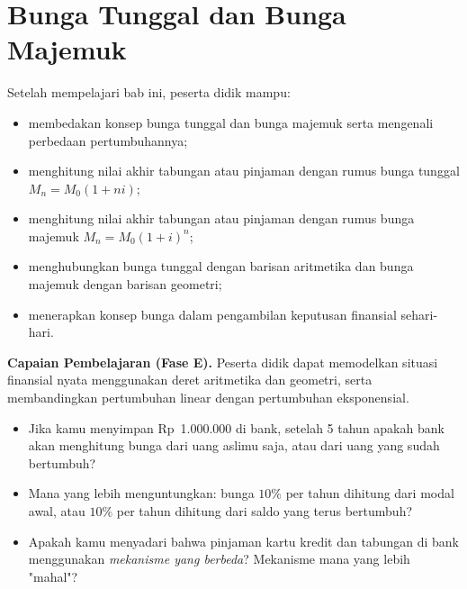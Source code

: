 \documentclass[11pt,a4paper]{report}
\theoremstyle{gaya}
\begin{document}
\chapter{Bunga Tunggal dan Bunga Majemuk}
\begin{tujuan}
Setelah mempelajari bab ini, peserta didik mampu:
\begin{itemize}[leftmargin=*,topsep=2pt]
  \item membedakan konsep bunga tunggal dan bunga majemuk serta mengenali perbedaan pertumbuhannya;
  \item menghitung nilai akhir tabungan atau pinjaman dengan rumus bunga tunggal $M_n = M_0(1+ni)$;
  \item menghitung nilai akhir tabungan atau pinjaman dengan rumus bunga majemuk $M_n = M_0(1+i)^n$;
  \item menghubungkan bunga tunggal dengan barisan aritmetika dan bunga majemuk dengan barisan geometri;
  \item menerapkan konsep bunga dalam pengambilan keputusan finansial sehari-hari.
\end{itemize}
\textbf{Capaian Pembelajaran (Fase E).} Peserta didik dapat memodelkan situasi finansial nyata menggunakan deret aritmetika dan geometri, serta membandingkan pertumbuhan linear dengan pertumbuhan eksponensial.
\end{tujuan}

\begin{pemantik}
\begin{itemize}[leftmargin=*,topsep=2pt]
  \item Jika kamu menyimpan Rp~1.000.000 di bank, setelah 5 tahun apakah bank akan menghitung bunga dari uang aslimu saja, atau dari uang yang sudah bertumbuh?
  \item Mana yang lebih menguntungkan: bunga $10\%$ per tahun dihitung dari modal awal, atau $10\%$ per tahun dihitung dari saldo yang terus bertumbuh?
  \item Apakah kamu menyadari bahwa pinjaman kartu kredit dan tabungan di bank menggunakan \emph{mekanisme yang berbeda}? Mekanisme mana yang lebih "mahal"?
\end{itemize}
\end{pemantik}
\end{document}
